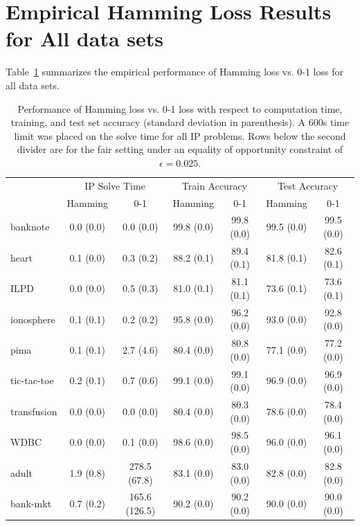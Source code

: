 \documentclass[twoside,11pt]{article}
\begin{document}
\newpage

\section{Empirical Hamming Loss Results for All data sets} \label{app:hamming_empirical}

Table~\ref{HammingComputationTableFull} summarizes the empirical performance of Hamming loss vs. 0-1 loss for all data sets.

\begin{table}[h]
\centering\footnotesize
\caption{\label{HammingComputationTableFull} Performance of Hamming loss vs. 0-1 loss with respect to computation time, training, and test set accuracy (standard deviation in parenthesis). A 600s time limit was placed on the solve time for all IP problems. Rows below the second divider are for the fair setting under an equality of opportunity constraint of $\epsilon=0.025$.}
\setlength{\tabcolsep}{5pt} %
\begin{tabular}{l  c c c c c c }		\toprule
& \multicolumn{2}{c}{IP Solve Time} & \multicolumn{2}{c}{Train Accuracy} & \multicolumn{2}{c}{Test Accuracy} \\
 &Hamming & 0-1 &Hamming & 0-1 & Hamming & 0-1\\\midrule
  banknote & 0.0 (0.0) & 0.0 (0.0) & 99.8 (0.0) & 99.8 (0.0) & 99.5 (0.0) & 99.5 (0.0) \\
heart & 0.1 (0.0) & 0.3 (0.2) & 88.2 (0.1) & 89.4 (0.1) & 81.8 (0.1) & 82.6 (0.1) \\
ILPD & 0.0 (0.0) & 0.5 (0.3) & 81.0 (0.1) & 81.1 (0.1) & 73.6 (0.1) & 73.6 (0.1) \\
ionosphere & 0.1 (0.1) & 0.2 (0.2) & 95.8 (0.0) & 96.2 (0.0) & 93.0 (0.0) & 92.8 (0.0) \\
pima & 0.1 (0.1) & 2.7 (4.6) & 80.4 (0.0) & 80.8 (0.0) & 77.1 (0.0) & 77.2 (0.0) \\
tic-tac-toe & 0.2 (0.1) & 0.7 (0.6) & 99.1 (0.0) & 99.1 (0.0) & 96.9 (0.0) & 96.9 (0.0) \\
transfusion & 0.0 (0.0) & 0.0 (0.0) & 80.4 (0.0) & 80.3 (0.0) & 78.6 (0.0) & 78.4 (0.0) \\
WDBC & 0.0 (0.0) & 0.1 (0.0) & 98.6 (0.0) & 98.5 (0.0) & 96.0 (0.0) & 96.1 (0.0) \\ \midrule 
adult & 1.9 (0.8) & 278.5 (67.8) & 83.1 (0.0) & 83.0 (0.0) & 82.8 (0.0) & 82.8 (0.0) \\
bank-mkt & 0.7 (0.2) & 165.6 (126.5) & 90.2 (0.0) & 90.2 (0.0) & 90.0 (0.0) & 90.0 (0.0) \\

\end{tabular}
\end{table}
\end{document}
